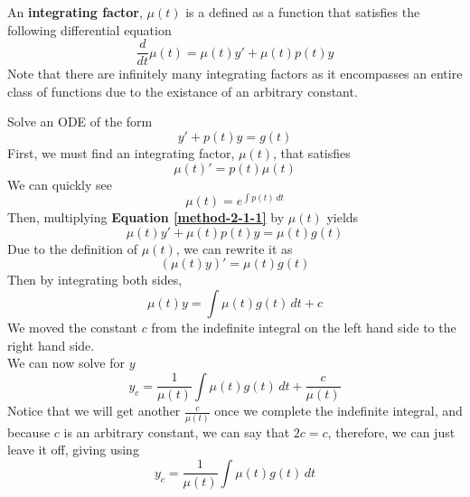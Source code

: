 \documentclass[diffeq.tex]{subfiles}
\begin{document}
    \begin{definition}
        An \textbf{integrating factor}, $\mu(t)$ is a defined as a function that satisfies the following differential equation
        \begin{equation}
            \frac{d}{dt}\mu(t) = \mu(t)y' + \mu(t)p(t)y
        \end{equation}
        Note that there are infinitely many integrating factors as it encompasses an entire class of functions due to the existance of an arbitrary constant.
    \end{definition}
    \np
    \begin{method}
        \label{method-2-1}
        Solve an ODE of the form
        \begin{equation}
            \label{method-2-1-1}
            y' + p(t)y = g(t)
        \end{equation}
        First, we must find an integrating factor, $\mu(t)$, that satisfies
        \begin{equation}
            \mu(t)' = p(t)\mu(t)
        \end{equation}
        We can quickly see
        \begin{equation}
            \mu(t) = e^{\int p(t)\,dt}
        \end{equation}
        Then, multiplying \textbf{Equation \ref{method-2-1-1}} by $\mu(t)$ yields
        \begin{equation}
            \mu(t)y' + \mu(t)p(t)y = \mu(t)g(t)
        \end{equation}
        Due to the definition of $\mu(t)$, we can rewrite it as
        \begin{equation}
            (\mu(t)y)' = \mu(t)g(t)
        \end{equation}
        Then by integrating both sides,
        \begin{equation}
            \mu(t)y = \int \mu(t)g(t)\,dt + c
        \end{equation}
        We moved the constant $c$ from the indefinite integral on the left hand side to the right hand side.\\[1em]
        We can now solve for $y$
        \begin{equation}
            y_{c} = \frac{1}{\mu(t)}\int \mu(t)g(t)\,dt + \frac{c}{\mu(t)}
        \end{equation}
        Notice that we will get another $\frac{c}{\mu(t)}$ once we complete the indefinite integral, and because $c$ is an arbitrary constant, we can say that $2c = c$, therefore, we can just leave it off, giving using
        \begin{equation}
            y_{c} = \frac{1}{\mu(t)}\int \mu(t)g(t)\,dt
        \end{equation}
    \end{method}
\end{document}
